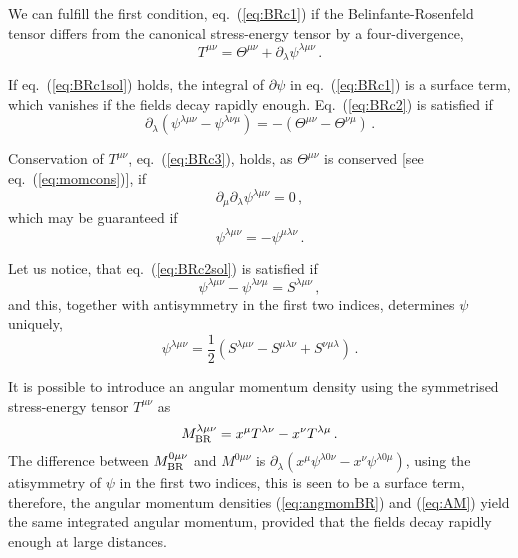 \documentclass[a4paper,12pt]{article}
\begin{document}
We can fulfill the first condition, eq.\ (\ref{eq:BRc1}) if the Belinfante-Rosenfeld tensor differs from the canonical stress-energy tensor by a four-divergence,
\begin{equation}\label{eq:BRc1sol}
 T^{\mu\nu} = \Theta^{\mu\nu}+ \partial_\lambda \psi^{\lambda\mu\nu}\,.
\end{equation}

If eq.\ (\ref{eq:BRc1sol}) holds, the integral of $\partial\psi$ in eq.\ (\ref{eq:BRc1}) is a surface term, which vanishes if the fields decay rapidly enough. Eq.\ (\ref{eq:BRc2}) is satisfied if
\begin{equation}\label{eq:BRc2sol}
\partial_\lambda \left(\psi^{\lambda\mu\nu}-\psi^{\lambda\nu\mu}\right) = -\left(\Theta^{\mu\nu}-\Theta^{\nu\mu}\right)\,.
\end{equation}

Conservation of $T^{\mu\nu}$, eq.\ (\ref{eq:BRc3}), holds, as $\Theta^{\mu\nu}$ is conserved [see eq.\ (\ref{eq:momcons})], if
\begin{equation}\label{eq:BRc3a}
 \partial_\mu\partial_\lambda \psi^{\lambda\mu\nu} = 0\,,
\end{equation}
which may be guaranteed if
\begin{equation}\label{eq:BRc3sol}
 \psi^{\lambda\mu\nu} = -\psi^{\mu\lambda\nu}\,.
\end{equation}

Let us notice, that eq.\ (\ref{eq:BRc2sol}) is satisfied if
\begin{equation}\label{eq:BRc2sol2}
 \psi^{\lambda\mu\nu}-\psi^{\lambda\nu\mu} = S^{\lambda\mu\nu}\,,
\end{equation}
and this, together with antisymmetry in the first two indices, determines $\psi$ uniquely,
\begin{equation}\label{eq:BRsol}
 \psi^{\lambda\mu\nu} = \frac{1}{2}\left(S^{\lambda\mu\nu} -S^{\mu\lambda\nu}+S^{\nu\mu\lambda}\right)\,.
\end{equation}


It is possible to introduce an angular momentum density using the symmetrised stress-energy tensor $T^{\mu\nu}$ as
\begin{equation}\label{eq:angmomBR}
 M^{\lambda\mu\nu}_{\rm BR} = x^\mu T^{\lambda\nu} - x^\nu T^{\lambda\mu}\,.
\end{equation}
The difference between $M^{0\mu\nu}_{\rm BR}$ and $M^{0\mu\nu}$ is $\partial_\lambda(x^\mu \psi^{\lambda0\nu} - x^\nu \psi^{\lambda0\mu})$, using the atisymmetry of $\psi$ in the first two indices, this is seen to be a surface term, therefore, the angular momentum densities (\ref{eq:angmomBR}) and (\ref{eq:AM}) yield the same integrated angular momentum, provided that the fields decay rapidly enough at large distances.
\end{document}
